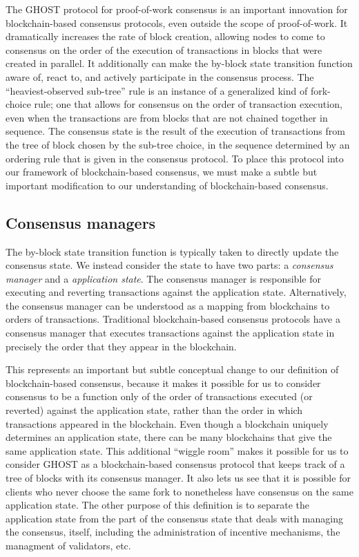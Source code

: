 \documentclass[11pt,a4paper]{article}
\begin{document}
The GHOST protocol for proof-of-work consensus\cite{GHOST} is an important innovation for blockchain-based consensus protocols, even outside the scope of proof-of-work. It dramatically increases the rate of block creation, allowing nodes to come to consensus on the order of the execution of transactions in blocks that were created in parallel. It additionally can make the by-block state transition function aware of, react to, and actively participate in the consensus process. The ``heaviest-observed sub-tree'' rule is an instance of a generalized kind of fork-choice rule; one that allows for consensus on the order of transaction execution, even when the transactions are from blocks that are not chained together in sequence. The consensus state is the result of the execution of transactions from the tree of block chosen by the sub-tree choice, in the sequence determined by an ordering rule that is given in the consensus protocol. To place this protocol into our framework of blockchain-based consensus, we must make a subtle but important modification to our understanding of blockchain-based consensus.


\subsection{Consensus managers}

The by-block state transition function is typically taken to directly update the consensus state. We instead consider the state to have two parts: a \emph{consensus manager} and a \emph{application state}. The consensus manager is responsible for executing and reverting transactions against the application state. Alternatively, the consensus manager can be understood as a mapping from blockchains to orders of transactions. Traditional blockchain-based consensus protocols have a consensus manager that executes transactions against the application state in precisely the order that they appear in the blockchain.

This represents an important but subtle conceptual change to our definition of blockchain-based consensus, because it makes it possible for us to consider consensus to be a function only of the order of transactions executed (or reverted) against the application state, rather than the order in which transactions appeared in the blockchain. Even though a blockchain uniquely determines an application state, there can be many blockchains that give the same application state. This additional ``wiggle room'' makes it possible for us to consider GHOST as a blockchain-based consensus protocol that keeps track of a tree of blocks with its consensus manager. It also lets us see that it is possible for clients who never choose the same fork to nonetheless have consensus on the same application state. The other purpose of this definition is to separate the application state from the part of the consensus state that deals with managing the consensus, itself, including the administration of incentive mechanisms, the managment of validators, etc.
\end{document}
